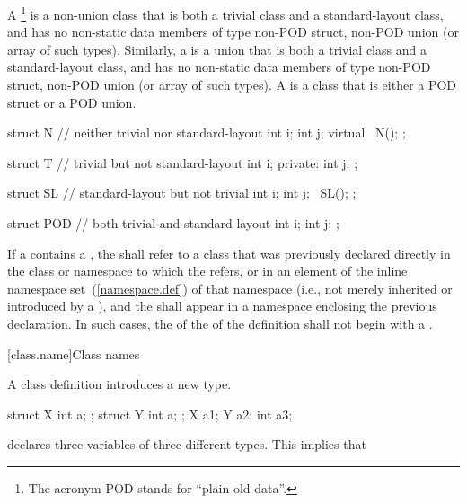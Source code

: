 \pnum
{}%
A \footnote{The acronym POD stands for ``plain old data''.}
is a non-union class that is both a trivial class and a
standard-layout class, and has no non-static data members of type non-POD struct,
non-POD union (or array of such types). Similarly, a
 is a union that is both a trivial class and a standard-layout
class, and has no non-static data members of type non-POD struct, non-POD
union (or array of such types). A  is a
class that is either a POD struct or a POD union.

\enterexample
\begin{codeblock}
struct N {          // neither trivial nor standard-layout
  int i;
  int j;
  virtual ~N();
};

struct T {          // trivial but not standard-layout
  int i;
private: 
  int j;
};

struct SL {         // standard-layout but not trivial
  int i;
  int j;
  ~SL();
};

struct POD {        // both trivial and standard-layout
  int i;
  int j;
};
\end{codeblock}
\exitexample

\pnum
If a  contains a ,
the  shall refer to a class that was
previously declared directly in the class or namespace to which the
 refers,
or in an element of the inline namespace set~(\ref{namespace.def}) of that namespace
(i.e., not merely inherited or
introduced by a ), and the
 shall appear in a namespace enclosing the
previous declaration.
In such cases, the  of the
 of the
definition shall not begin with a .

[class.name]{Class names}
%
%
%

\pnum
A class definition introduces a new type.
\enterexample

\begin{codeblock}
struct X { int a; };
struct Y { int a; };
X a1;
Y a2;
int a3;
\end{codeblock}

declares three variables of three different types. This implies that

